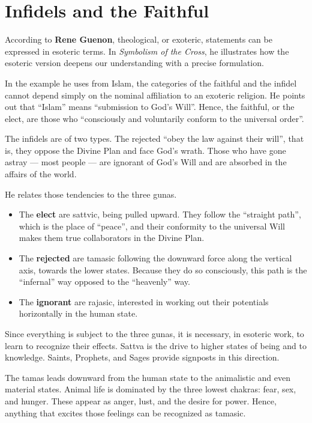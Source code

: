\section{Infidels and the Faithful}

According to \textbf{Rene Guenon}, theological, or exoteric, statements can be expressed in esoteric terms. In \emph{Symbolism of the Cross}, he illustrates how the esoteric version deepens our understanding with a precise formulation.

In the example he uses from Islam, the categories of the faithful and the infidel cannot depend simply on the nominal affiliation to an exoteric religion. He points out that ``Islam'' means ``submission to God's Will''. Hence, the faithful, or the elect, are those who ``consciously and voluntarily conform to the universal order''.

The infidels are of two types. The rejected ``obey the law against their will'', that is, they oppose the Divine Plan and face God's wrath. Those who have gone astray --- most people --- are ignorant of God's Will and are absorbed in the affairs of the world.

He relates those tendencies to the three gunas.

\begin{itemize}

\item The \textbf{elect} are sattvic, being pulled upward. They follow the ``straight path'', which is the place of ``peace'', and their conformity to the universal Will makes them true collaborators in the Divine Plan.

\item The \textbf{rejected} are tamasic following the downward force along the vertical axis, towards the lower states. Because they do so consciously, this path is the ``infernal'' way opposed to the ``heavenly'' way.

\item The \textbf{ignorant} are rajasic, interested in working out their potentials horizontally in the human state.
\end{itemize}


Since everything is subject to the three gunas, it is necessary, in esoteric work, to learn to recognize their effects. Sattva is the drive to higher states of being and to knowledge. Saints, Prophets, and Sages provide signposts in this direction.

The tamas leads downward from the human state to the animalistic and even material states. Animal life is dominated by the three lowest chakras: fear, sex, and hunger. These appear as anger, lust, and the desire for power. Hence, anything that excites those feelings can be recognized as tamasic.

